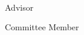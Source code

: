 \thispagestyle{empty}
\begin{center}
    \spacedlowsmallcaps{\myName} \\ \medskip                        

    \begingroup
        \color{Maroon}\spacedallcaps{\myTitle}
    \endgroup
\end{center}        

{\flushright Advisor\hspace{0.5cm}          \makebox[3in]{\hrulefill}}

{\flushright Committee Member\hspace{0.5cm} \makebox[3in]{\hrulefill}}

